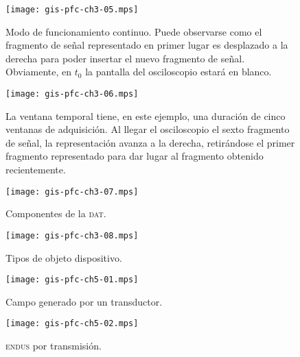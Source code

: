 \documentclass[a4paper,12pt]				{article}
\begin{document}
\clearpage

\begin{figure}
	\begin{center}
		\texttt{[image: gis-pfc-ch3-05.mps]}
	\end{center}
	\caption[Modo de funcionamiento continuo del osciloscopio]{Modo de
	funcionamiento continuo. Puede observarse como el fragmento de
	señal representado en primer lugar es desplazado a la derecha para
	poder insertar el nuevo fragmento de señal. Obviamente, en $t_0$ la
	pantalla del osciloscopio estará en blanco.}
	\label{fig:digcontosc}
\end{figure}

\begin{figure}
	\begin{center}
		\texttt{[image: gis-pfc-ch3-06.mps]}
	\end{center}
	\caption[Modo de funcionamiento continuo]{La ventana temporal
	tiene, en este ejemplo, una duración de cinco ventanas de
	adquisición. Al llegar el osciloscopio el sexto fragmento de señal,
	la representación avanza a la derecha, retirándose el primer
	fragmento representado para dar lugar al fragmento obtenido
	recientemente.}
	\label{fig:digcontosccont}
\end{figure}

\begin{figure}
	\begin{center}
		\texttt{[image: gis-pfc-ch3-07.mps]}
	\end{center}
	\caption[Componentes de la \textsc{dat}]{Componentes de la
	\textsc{dat}.}
	\label{fig:dat}
\end{figure}

\begin{figure}
	\begin{center}
		\texttt{[image: gis-pfc-ch3-08.mps]}
	\end{center}
	\caption[Tipos de objeto dispositivo]{Tipos de objeto dispositivo.}
	\label{fig:devobject}
\end{figure}

\clearpage

\begin{figure}
	\begin{center}
		\texttt{[image: gis-pfc-ch5-01.mps]}
	\end{center}
	\caption[Campo generado por un transductor]{Campo generado por un
	transductor.}
	\label{fig:field}
\end{figure}

\begin{figure}
	\begin{center}
		\texttt{[image: gis-pfc-ch5-02.mps]}
	\end{center}
	\caption[\textsc{endus} por transmisión]{\textsc{endus} por
	transmisión.}
	\label{fig:transmission}
\end{figure}
\end{document}
